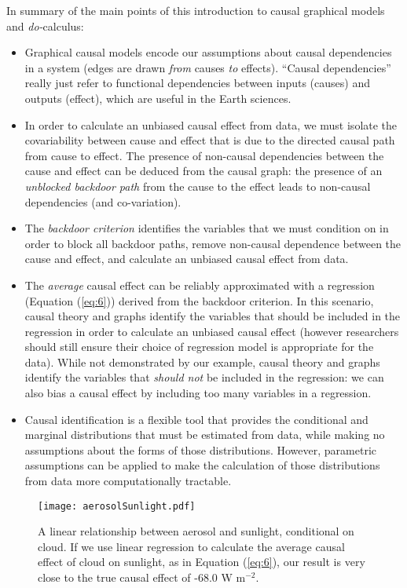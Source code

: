 \documentclass[12pt]{article}
\begin{document}
In summary of the main points of this introduction to causal graphical
models and \textit{do-}calculus:

\begin{itemize}
\item Graphical causal models encode our assumptions about causal
  dependencies in a system (edges are drawn \emph{from} causes \emph{to}
  effects). ``Causal dependencies'' really just refer to functional
  dependencies between inputs (causes) and outputs (effect), which are
  useful in the Earth sciences.
\item In order to calculate an unbiased causal effect from data, we
  must isolate the covariability between cause and effect that is due
  to the directed causal path from cause to effect. The presence of
  non-causal dependencies between the cause and effect can be deduced
  from the causal graph: the presence of an \textit{unblocked backdoor
    path} from the cause to the effect leads to non-causal
  dependencies (and co-variation).
\item The \emph{backdoor criterion} identifies the variables that we
  must condition on in order to block all backdoor paths, remove
  non-causal dependence between the cause and effect, and calculate an
  unbiased causal effect from data.
\item The \emph{average} causal effect can be reliably approximated
  with a regression (Equation (\ref{eq:6})) derived from the backdoor
  criterion. In this scenario, causal theory and graphs identify the
  variables that should be included in the regression in order to
  calculate an unbiased causal effect (however researchers should
  still ensure their choice of regression model is appropriate for the
  data). While not demonstrated by our example, causal theory and
  graphs identify the variables that \textit{should not} be included
  in the regression: we can also bias a causal effect by
  including too many variables in a regression.
\item Causal identification is a flexible tool that provides the
  conditional and marginal distributions that must be estimated from data,
  while making no assumptions about the forms of those
  distributions. However, parametric assumptions can be applied to
  make the calculation of those distributions from data more
  computationally tractable.
\end{itemize}

\begin{figure} \texttt{[image: aerosolSunlight.pdf]}
  \caption{A linear relationship between aerosol and sunlight,
    conditional on cloud. If we use linear regression to calculate the
    average causal effect of cloud on sunlight, as in Equation
    (\ref{eq:6}), our result is very close to the true causal effect of
    -68.0 W m$^{-2}$.}
  \label{fig:linear}
\end{figure}
\end{document}

